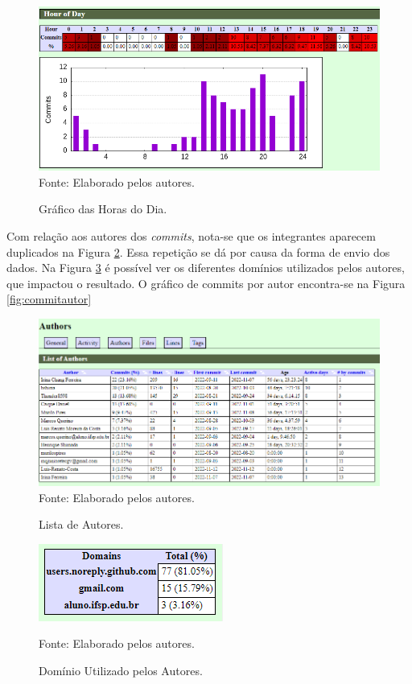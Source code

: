 \documentclass[
    12pt,               %
    openright,          %
    oneside,
    a4paper,            %
    BIBLATEX,           %
    TODO,               %
    english,            %
    brazil              %
    ]{ifsp-spo-inf-ctds}
\begin{document}
      \begin{figure}[H]
            \centering
            \caption{Gráfico das Horas do Dia.}
            \includegraphics[width=1 \textwidth]{Gitstats/documento/horasdodia.png}
            {\footnotesize Fonte: Elaborado pelos autores.}
            \label{fig:horadodia}
        \end{figure} 

    Com relação aos autores dos \emph{commits}, nota-se que os integrantes aparecem duplicados na Figura \ref{fig:listaautores}. Essa repetição se dá por causa da forma de envio dos dados. Na Figura \ref{fig:dominio} é possível ver os diferentes domínios utilizados pelos autores, que impactou o resultado. O gráfico de commits por autor encontra-se na Figura \ref{fig:commitautor}
    
    \begin{figure}[H]
                \centering
                \caption{Lista de Autores.}
                \includegraphics[width=1 \textwidth]{Gitstats/documento/lista de autores.png}
                {\footnotesize Fonte: Elaborado pelos autores.}
                \label{fig:listaautores}
            \end{figure}
            
    \begin{figure}[H]
            \centering
            \caption{Domínio Utilizado pelos Autores.}
            \includegraphics[scale = 1.5]{Gitstats/documento/dominios1.png}
  
            {\footnotesize Fonte: Elaborado pelos autores.}
            \label{fig:dominio}
        \end{figure}  
\end{document}
